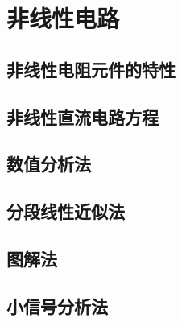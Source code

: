 \chapter{非线性电路}

\section{非线性电阻元件的特性}

\section{非线性直流电路方程}

\section{数值分析法}

\section{分段线性近似法}

\section{图解法}

\section{小信号分析法}